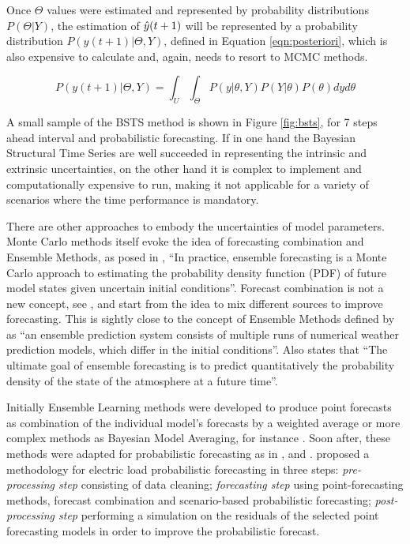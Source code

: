 Once $\Theta$ values were estimated and represented by probability distributions $P(\Theta|Y)$, the estimation of $\hat{y}(t+1)$ will be represented by a probability distribution $P(y(t+1)|\Theta,Y)$, defined in Equation \eqref{eqn:posteriori}, which is also expensive to calculate and, again, needs to resort to MCMC methods. 

\begin{equation}
    P(y(t+1)|\Theta,Y) =  \int_U \int_\Theta P(y|\theta,Y)P(Y|\theta)P(\theta) dy d\theta
    \label{eqn:posteriori}
\end{equation}

A small sample of the BSTS method is shown in Figure \ref{fig:bsts}, for 7 steps ahead interval and probabilistic forecasting. If in one hand the Bayesian Structural Time Series are well succeeded in representing the intrinsic and extrinsic uncertainties, on the other hand it is complex to implement and computationally expensive to run, making it not applicable for a variety of scenarios where the time performance is mandatory.


There are other approaches to embody the  uncertainties of model parameters. Monte Carlo methods itself evoke the idea of forecasting combination and Ensemble Methods, as posed in \cite{Smith2001}, ``In practice, ensemble forecasting is a Monte Carlo approach to estimating the probability density function (PDF) of future model states given uncertain initial conditions''. Forecast combination is not a new concept, see \citep{Clemen1989}, and start from the idea to mix different sources to improve forecasting. This is sightly close to the concept of Ensemble Methods defined by \cite{Gneiting2008} as ``an ensemble prediction system consists of multiple runs of numerical weather prediction models, which differ in the initial conditions''. Also \cite{Leutbecher2008} states that ``The ultimate goal of ensemble forecasting is to predict quantitatively the probability density of the state of the atmosphere at a future time''. 

Initially Ensemble Learning methods were developed to produce point forecasts as combination of the individual model's forecasts by a weighted average or more complex methods as Bayesian Model Averaging, for instance  \cite{Raftery2005}. Soon after, these methods were adapted for probabilistic forecasting as in \cite{Gneiting2005}, \cite{Leutbecher2008} and \cite{Fraley2013}. \cite{Xie2016} proposed a methodology for electric load probabilistic forecasting in three steps: \textit{pre-processing step} consisting of data cleaning;  \textit{forecasting step} using point-forecasting methods, forecast combination and scenario-based probabilistic forecasting; \textit{post-processing step} performing a simulation on the residuals of the selected point forecasting models in order to improve the probabilistic forecast.

